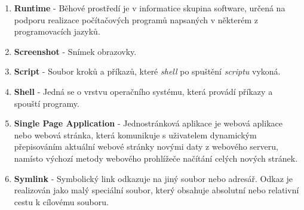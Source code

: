 \documentclass[12pt,a4paper]{report}
\begin{document}
\begin{enumerate}
    \item \textbf{Runtime} - Běhové prostředí je v informatice skupina software, určená na podporu realizace počítačových programů napsaných v některém z programovacích jazyků.
    \item \textbf{Screenshot} - Snímek obrazovky.
    \item \textbf{Script} - Soubor kroků a příkazů, které \emph{shell} po spuštění \emph{scriptu} vykoná.
    \item \textbf{Shell} - Jedná se o vrstvu operačního systému, která provádí příkazy a spouští programy.
    \item \textbf{Single Page Application} - Jednostránková aplikace je webová aplikace nebo webová stránka, která komunikuje s uživatelem dynamickým přepisováním aktuální webové stránky novými daty z webového serveru, namísto výchozí metody webového prohlížeče načítání celých nových stránek.
    \item \textbf{Symlink} - Symbolický link odkazuje na jiný soubor nebo adresář. Odkaz je realizován jako malý speciální soubor, který obsahuje absolutní nebo relativní cestu k cílovému souboru.
  \end{enumerate}

  \clearpage
\end{document}
